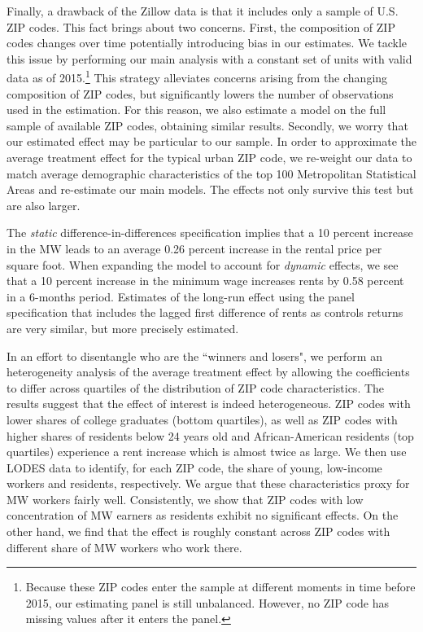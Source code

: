 Finally, a drawback of the Zillow data is that it includes only a sample of U.S. ZIP codes. 
This fact brings about two concerns.
First, the composition of ZIP codes changes over time potentially introducing bias in our 
estimates. We tackle this issue by performing our main analysis with a constant set of 
units with valid data as of 2015.\footnote{Because these ZIP codes enter the sample at 
	different moments in time before 2015, our estimating panel is still unbalanced. 
	However, no ZIP code has missing values after it enters the panel.}
This strategy alleviates concerns arising from the changing composition of ZIP codes, but 
significantly lowers the number of observations used in the estimation. For this reason, 
we also estimate a model on the full sample of available ZIP codes, obtaining similar 
results.
Secondly, we worry that our estimated effect may be particular to our sample. In order 
to approximate the average treatment effect for the typical urban ZIP code, we re-weight 
our data to match average demographic characteristics of the top 100 Metropolitan 
Statistical Areas and re-estimate our main models. The effects not only survive this test 
but are also larger.

The \textit{static} difference-in-differences specification implies that a 10 percent 
increase in the MW leads to an average 0.26 percent increase in the rental price per 
square foot.
When expanding the model to account for \textit{dynamic} effects, we see that a 10 
percent increase in the minimum wage increases rents by 0.58 percent in a 6-months period.
Estimates of the long-run effect using the panel specification that includes the lagged 
first difference of rents as controls returns are very similar, but more precisely 
estimated.

In an effort to disentangle who are the ``winners and losers", we perform an 
heterogeneity analysis of the average treatment effect by allowing the coefficients to 
differ across quartiles of the distribution of ZIP code characteristics.
The results suggest that the effect of interest is indeed heterogeneous.
ZIP codes with lower shares of college graduates (bottom quartiles), as well as 
ZIP codes with higher shares of residents below 24 years old and African-American 
residents (top quartiles) experience a rent increase which is almost twice as large.
We then use LODES data to identify, for each ZIP code, the share of young, low-income 
workers and residents, respectively.
We argue that these characteristics proxy for MW workers fairly well.
Consistently, we show that ZIP codes with low concentration of MW earners as residents 
exhibit no significant effects.
On the other hand, we find that the effect is roughly constant across ZIP codes with 
different share of MW workers who work there.

